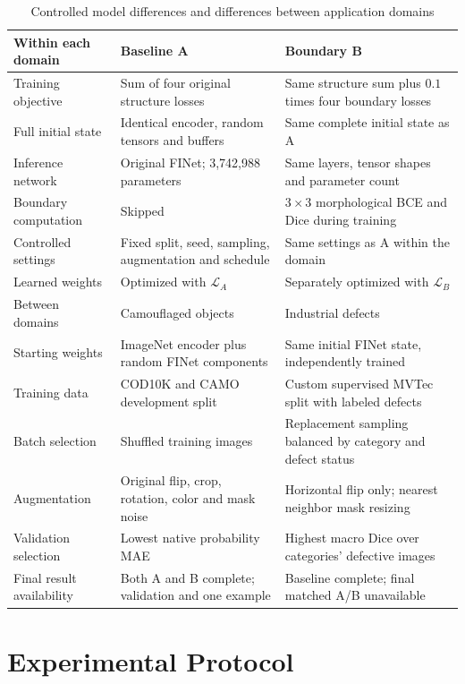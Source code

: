 \documentclass[conference,letterpaper]{IEEEtran}
\begin{document}
\begin{table}[!t]
\caption{Controlled model differences and differences between application domains}
\label{tab:comparison}
\centering\footnotesize
\begin{tabular}{L{0.19\textwidth}L{0.34\textwidth}L{0.34\textwidth}}
\hline
Within each domain & Baseline A & Boundary B\\
\hline
Training objective & Sum of four original structure losses & Same structure sum plus $0.1$ times four boundary losses\\
Full initial state & Identical encoder, random tensors and buffers & Same complete initial state as A\\
Inference network & Original FINet; 3,742,988 parameters & Same layers, tensor shapes and parameter count\\
Boundary computation & Skipped & $3\times3$ morphological BCE and Dice during training\\
Controlled settings & Fixed split, seed, sampling, augmentation and schedule & Same settings as A within the domain\\
Learned weights & Optimized with $\mathcal L_A$ & Separately optimized with $\mathcal L_B$\\
\hline
Between domains & Camouflaged objects & Industrial defects\\
\hline
Starting weights & ImageNet encoder plus random FINet components & Same initial FINet state, independently trained\\
Training data & COD10K and CAMO development split & Custom supervised MVTec split with labeled defects\\
Batch selection & Shuffled training images & Replacement sampling balanced by category and defect status\\
Augmentation & Original flip, crop, rotation, color and mask noise & Horizontal flip only; nearest neighbor mask resizing\\
Validation selection & Lowest native probability MAE & Highest macro Dice over categories' defective images\\
Final result availability & Both A and B complete; validation and one example & Baseline complete; final matched A/B unavailable\\
\hline
\end{tabular}
\end{table}

\section{Experimental Protocol}
\end{document}
